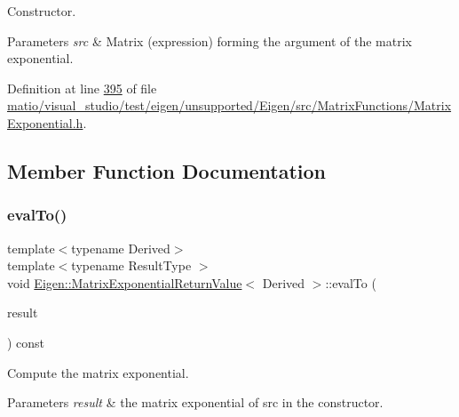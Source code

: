 Constructor. 


\begin{DoxyParams}{Parameters}
{\em src} & Matrix (expression) forming the argument of the matrix exponential. \\
\hline
\end{DoxyParams}


Definition at line \hyperlink{matio_2visual__studio_2test_2eigen_2unsupported_2_eigen_2src_2_matrix_functions_2_matrix_exponential_8h_source_l00395}{395} of file \hyperlink{matio_2visual__studio_2test_2eigen_2unsupported_2_eigen_2src_2_matrix_functions_2_matrix_exponential_8h_source}{matio/visual\+\_\+studio/test/eigen/unsupported/\+Eigen/src/\+Matrix\+Functions/\+Matrix\+Exponential.\+h}.



\subsection{Member Function Documentation}
\mbox{\label{struct_eigen_1_1_matrix_exponential_return_value_a3dd2c65c7c6cdc41ab17415ee11899a0}} 
\subsubsection{\texorpdfstring{eval\+To()}{evalTo()}\hspace{0.1cm}{\footnotesize\ttfamily [1/2]}}
{\footnotesize\ttfamily template$<$typename Derived$>$ \\
template$<$typename Result\+Type $>$ \\
void \hyperlink{struct_eigen_1_1_matrix_exponential_return_value}{Eigen\+::\+Matrix\+Exponential\+Return\+Value}$<$ Derived $>$\+::eval\+To (\begin{DoxyParamCaption}\item[{Result\+Type \&}]{result }\end{DoxyParamCaption}) const\hspace{0.3cm}{\ttfamily [inline]}}



Compute the matrix exponential. 


\begin{DoxyParams}{Parameters}
{\em result} & the matrix exponential of {\ttfamily src} in the constructor. \\
\hline
\end{DoxyParams}


